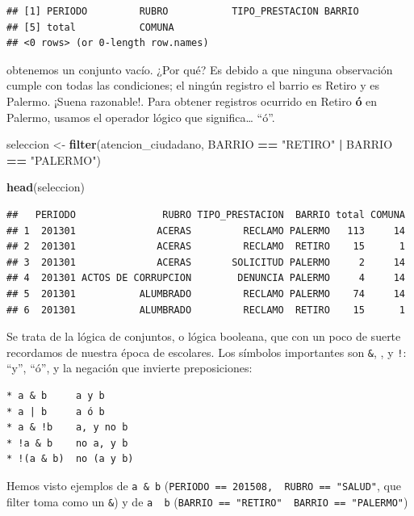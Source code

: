 \documentclass[]{book}
\newenvironment{Shaded}{\begin{snugshade}}{\end{snugshade}}
\newcommand{\KeywordTok}[1]{\textcolor[rgb]{0.13,0.29,0.53}{\textbf{#1}}}
\newcommand{\StringTok}[1]{\textcolor[rgb]{0.31,0.60,0.02}{#1}}
\newcommand{\OperatorTok}[1]{\textcolor[rgb]{0.81,0.36,0.00}{\textbf{#1}}}
\newcommand{\NormalTok}[1]{#1}
\begin{document}
\begin{verbatim}
## [1] PERIODO         RUBRO           TIPO_PRESTACION BARRIO         
## [5] total           COMUNA         
## <0 rows> (or 0-length row.names)
\end{verbatim}

obtenemos un conjunto vacío. ¿Por qué? Es debido a que ninguna
observación cumple con todas las condiciones; el ningún registro el
barrio es Retiro y es Palermo. ¡Suena razonable!. Para obtener registros
ocurrido en Retiro \textbf{ó} en Palermo, usamos el operador lógico
\texttt{\textbar{}} que significa\ldots{} ``ó''.

\begin{Shaded}
\begin{Highlighting}[]
\NormalTok{seleccion <-}\StringTok{ }\KeywordTok{filter}\NormalTok{(atencion_ciudadano, BARRIO }\OperatorTok{==}\StringTok{ "RETIRO"} \OperatorTok{|}\StringTok{ }\NormalTok{BARRIO }\OperatorTok{==}\StringTok{ "PALERMO"}\NormalTok{)}

\KeywordTok{head}\NormalTok{(seleccion)}
\end{Highlighting}
\end{Shaded}

\begin{verbatim}
##   PERIODO               RUBRO TIPO_PRESTACION  BARRIO total COMUNA
## 1  201301              ACERAS         RECLAMO PALERMO   113     14
## 2  201301              ACERAS         RECLAMO  RETIRO    15      1
## 3  201301              ACERAS       SOLICITUD PALERMO     2     14
## 4  201301 ACTOS DE CORRUPCION        DENUNCIA PALERMO     4     14
## 5  201301           ALUMBRADO         RECLAMO PALERMO    74     14
## 6  201301           ALUMBRADO         RECLAMO  RETIRO    15      1
\end{verbatim}

Se trata de la lógica de conjuntos, o lógica booleana, que con un poco
de suerte recordamos de nuestra época de escolares. Los símbolos
importantes son \texttt{\&}, \texttt{\textbar{}}, y \texttt{!}: ``y'',
``ó'', y la negación que invierte preposiciones:

\begin{verbatim}
* a & b     a y b
* a | b     a ó b
* a & !b    a, y no b
* !a & b    no a, y b
* !(a & b)  no (a y b) 
\end{verbatim}

Hemos visto ejemplos de \texttt{a\ \&\ b}
(\texttt{PERIODO\ ==\ 201508,\ \ RUBRO\ ==\ "SALUD"}, que filter toma
como un \texttt{\&}) y de \texttt{a\ \textbar{}\ b}
(\texttt{BARRIO\ ==\ "RETIRO"\ \textbar{}\ BARRIO\ ==\ "PALERMO"})
\end{document}
